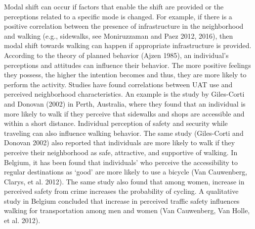 \documentclass[]{elsarticle} %
\begin{document}
Modal shift can occur if factors that enable the shift are provided or
the perceptions related to a specific mode is changed. For example, if
there is a positive correlation between the presence of infrastructure
in the neighborhood and walking (e.g., sidewalks, see Moniruzzaman and
Paez 2012, 2016), then modal shift towards walking can happen if
appropriate infrastructure is provided. According to the theory of
planned behavior (Ajzen 1985), an individual's perceptions and attitudes
can influence their behavior. The more positive feelings they possess,
the higher the intention becomes and thus, they are more likely to
perform the activity. Studies have found correlations between UAT use
and perceived neighborhood characteristics. An example is the study by
Giles-Corti and Donovan (2002) in Perth, Australia, where they found
that an individual is more likely to walk if they perceive that
sidewalks and shops are accessible and within a short distance.
Individual perception of safety and security while traveling can also
influence walking behavior. The same study (Giles-Corti and Donovan
2002) also reported that individuals are more likely to walk if they
perceive their neighborhood as safe, attractive, and supportive of
walking. In Belgium, it has been found that individuals' who perceive
the accessibility to regular destinations as `good' are more likely to
use a bicycle (Van Cauwenberg, Clarys, et al. 2012). The same study also
found that among women, increase in perceived safety from crime
increases the probability of cycling. A qualitative study in Belgium
concluded that increase in perceived traffic safety influences walking
for transportation among men and women (Van Cauwenberg, Van Holle, et
al. 2012).
\end{document}
